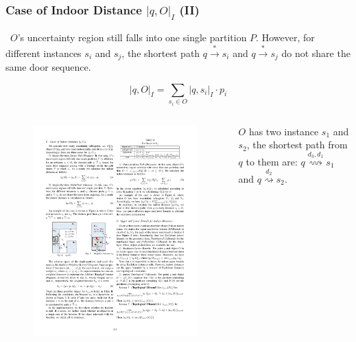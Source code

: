 \begin{frame}
\frametitle{Case of Indoor Distance $|q, O|_I$ (II)}

~$O$'s uncertainty region still falls into one single partition $P$. However, for different instances $s_i$ and $s_j$, the shortest path $q \overset{*}{\rightarrow} s_i$ and $q \overset{*}{\rightarrow} s_j$ do not share the same door sequence.

\begin{equation}
  |q, O|_{I} = \sum_{s_i \in O}|q, s_i|_I \cdot p_i
\end{equation}

\begin{columns}[c]

  \begin{figure}[tb]
    \includegraphics[width=\columnwidth]{figures/2-6/2-6-2.pdf}
  \end{figure}

  \begin{example}
    $O$ has two instance $s_1$ and $s_2$, the shortest path from $q$ to them are: $q \overset{d_3, d_1}{\rightsquigarrow} s_1$ and $q \overset{d_2}{\rightsquigarrow} s_2$.
  \end{example}

\end{columns}

\end{frame}

